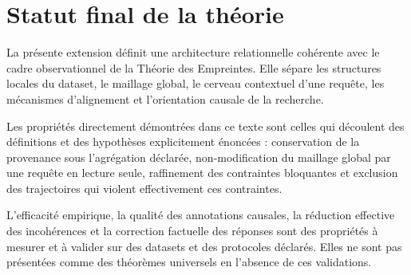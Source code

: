 \documentclass[11pt,a4paper,oneside]{book}
\theoremstyle{remark}
\begin{document}
\section{Statut final de la théorie}

La présente extension définit une architecture relationnelle
cohérente avec le cadre observationnel de la Théorie des Empreintes.
Elle sépare les structures locales du dataset, le maillage global,
le cerveau contextuel d'une requête, les mécanismes d'alignement
et l'orientation causale de la recherche.

Les propriétés directement démontrées dans ce texte sont celles
qui découlent des définitions et des hypothèses explicitement
énoncées : conservation de la provenance sous l'agrégation déclarée,
non-modification du maillage global par une requête en lecture seule,
raffinement des contraintes bloquantes et exclusion des trajectoires
qui violent effectivement ces contraintes.

L'efficacité empirique, la qualité des annotations causales,
la réduction effective des incohérences et la correction factuelle
des réponses sont des propriétés à mesurer et à valider sur des
datasets et des protocoles déclarés. Elles ne sont pas présentées
comme des théorèmes universels en l'absence de ces validations.
\end{document}
